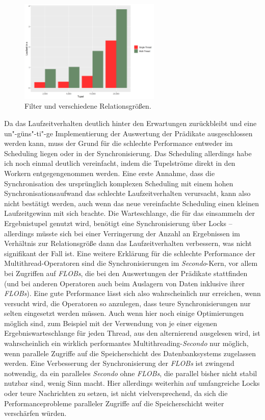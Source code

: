 \documentclass[a4paper,12pt,twoside]{article}
\newcommand{\Fb}[1]{\textit{#1}} %
\begin{document}
\begin{figure}
	\centering
	\includegraphics[width=0.60\textwidth]{Bilder/filter_head.png}
	\caption{Filter und verschiedene Relationsgrößen.}
	\label{img:filterHead}
\end{figure}

Da das Laufzeitverhalten deutlich hinter den Erwartungen zurückbleibt und eine un"-güns"-ti"-ge Implementierung der Auswertung der Prädikate ausgeschlossen werden kann, muss der Grund für die schlechte Performance entweder im Scheduling liegen oder in der Synchronisierung. Das Scheduling allerdings habe ich noch einmal deutlich vereinfacht, indem die Tupelströme direkt in den Workern entgegengenommen werden. Eine erste Annahme, dass die Synchronisation des ursprünglich komplexen Scheduling mit einem hohen Synchronisationsaufwand das schlechte Laufzeitverhalten verursacht, kann also nicht bestätigt werden, auch wenn das neue vereinfachte Scheduling einen kleinen Laufzeitgewinn mit sich brachte. Die Warteschlange, die für das einsammeln der Ergebnistupel genutzt wird, benötigt eine Synchronisierung über Locks -- allerdings müsste sich bei einer Verringerung der Anzahl an Ergebnissen im Verhältnis zur Relationsgröße dann das Laufzeitverhalten verbessern, was nicht signifikant der Fall ist. Eine weitere Erklärung für die schlechte Performance der Multithread-Operatoren sind die Synchronisierungen im \Fb{Secondo}-Kern, vor allem bei Zugriffen auf \Fb{FLOBs}, die bei den Auswertungen der Prädikate stattfinden (und bei anderen Operatoren auch beim Auslagern von Daten inklusive ihrer \Fb{FLOBs}). Eine gute Performance lässt sich also wahrscheinlich nur erreichen, wenn versucht wird, die Operatoren so anzulegen, dass teure Synchronisierungen nur selten eingesetzt werden müssen. Auch wenn hier noch einige Optimierungen möglich sind, zum Beispiel mit der Verwendung von je einer eigenen Ergebniswarteschlange für jeden Thread, aus den alternierend ausgelesen wird, ist wahrscheinlich ein wirklich performantes Multithreading-\Fb{Secondo} nur möglich, wenn parallele Zugriffe auf die Speicherschicht des Datenbanksystems zugelassen werden. Eine Verbesserung der Synchronisierung der \Fb{FLOBs} ist zwingend notwendig, da ein paralleles \Fb{Secondo} ohne \Fb{FLOBs}, die parallel bisher nicht stabil nutzbar sind, wenig Sinn macht. Hier allerdings weiterhin auf umfangreiche Locks oder teure Nachrichten zu setzen, ist nicht vielversprechend, da sich die Performanceprobleme paralleler Zugriffe auf die Speicherschicht weiter verschärfen würden. 
\end{document}
